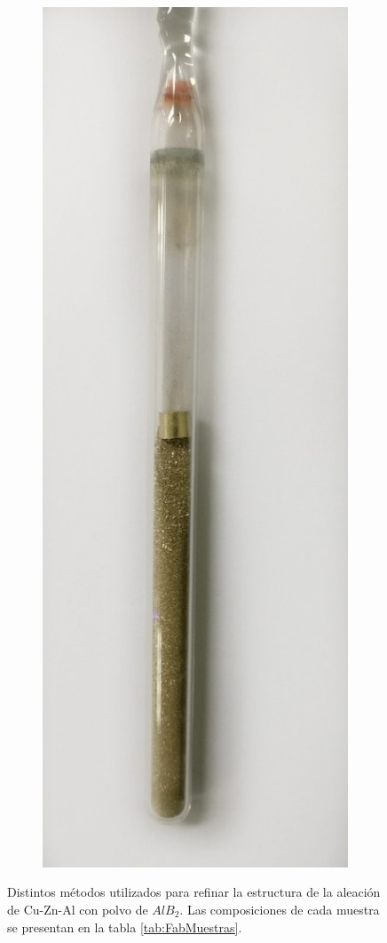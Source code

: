 \documentclass[a4paper,12pt,fleqn,twoside,openany]{book}
\begin{document}
\begin{figure}[h]
\begin{subfigure}{0.1\textwidth}
        \includegraphics[width=\textwidth]{Img/Procedimiento/ClavoPolvo.jpg}
        \caption{}
        \label{fig:ClavoPolvo}
    \end{subfigure}
 \caption{Distintos métodos utilizados para refinar la estructura de la aleación de Cu-Zn-Al con polvo de $AlB_2$. Las composiciones de cada muestra se presentan en la tabla \ref{tab:FabMuestras}.} 
    \end{figure}
    
\end{document}
